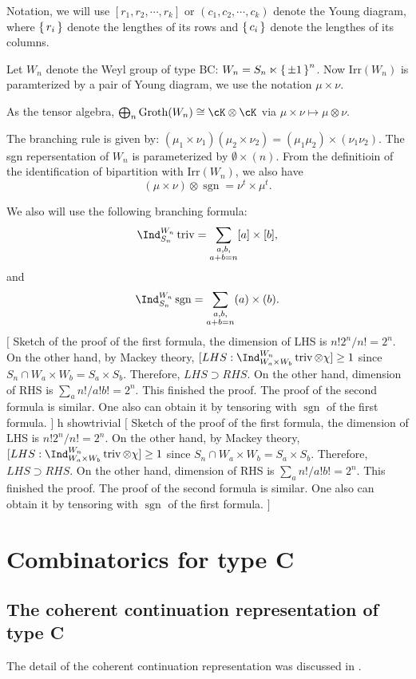 \documentclass[12pt,a4paper]{amsart}
\newcommand{\trivial}[2][]{\if\relax\detokenize{#1}\relax
  {%
      \color{orange} \vspace{0em} $[$  #2 $]$
      \color{black}
  }
  \else
\ifx#1h
\ifcsname showtrivial\endcsname
{%
    \color{orange} \vspace{0em}  $[$ #2 $]$
    \color{black}
}
\fi
\else {\red Wrong argument!} \fi
\fi
}
\newcommand{\sgn}{\operatorname{sgn}}
\newcommand{\triv}{\operatorname{triv}}
\numberwithin{equation}{section}
\theoremstyle{remark}
\def\Groth{\mathrm{Groth}}
\def\Irr{\mathrm{Irr}}
\begin{document}
Notation, we will use $[r_1, r_2, \cdots, r_k]$ or $(c_1,c_2, \cdots, c_k)$
denote the Young diagram, where $\set{r_i}$ denote the lengthes of its rows and
$\set{c_i}$ denote the lengthes of its columns.

Let $W_n$ denote the Weyl group of type BC: $W_n = S_n \ltimes \set{\pm 1}^n$.
Now $\Irr(W_n)$ is paramterized by a pair of Young diagram, we use the notation
$\mu\times \nu$.

As the tensor algebra, $\bigoplus_n \Groth(W_n)\cong \cK\otimes \cK$ via
$\mu\times \nu \mapsto \mu \otimes \nu$.
   
The branching rule is given by:
$(\mu_1\times \nu_1)(\mu_2\times \nu_2) = (\mu_1\mu_2)\times (\nu_1 \nu_2)$.
The sgn repersentation of $W_n$ is parameterized by $\emptyset\times (n)$.  From
the definitioin of the identification of bipartition with $\Irr(W_n)$, we also
have
\[
  (\mu\times \nu) \otimes \sgn = \nu^t\times \mu^t.
\]

We also will use the following branching formula:
\[
  \Ind_{S_n}^{W_n} \triv = \sum_{\substack{a,b,\\ a+b=n}} [a]\times [b],
\]
and
\begin{equation}\label{eq:SW2}
  \Ind_{S_n}^{W_n} \sgn = \sum_{\substack{a,b,\\ a+b=n}}
  (a)\times (b).
\end{equation}
\trivial{ Sketch of the proof of the first formula, the dimension of LHS is
  $n!2^n/n! = 2^n$.  On the other hand, by Mackey theory,
  $[LHS:\Ind_{W_a\times W_b}^{W_n} \triv \otimes \chi ] \geq 1$ since
  $S_n\cap W_a\times W_b = S_a\times S_b$.  Therefore, $LHS\supset RHS$.  On the
  other hand, dimension of RHS is $\sum_{a} n!/a!b! = 2^n$.  This finished the
  proof.  The proof of the second formula is similar. One also can obtain it by
  tensoring with $\sgn$ of the first formula.  }

 

\section{Combinatorics for type C}


\subsection{The coherent continuation representation of type C}
The detail of the coherent continuation representation was discussed in
\cite[p221 (7)]{Mc}.
\end{document}
